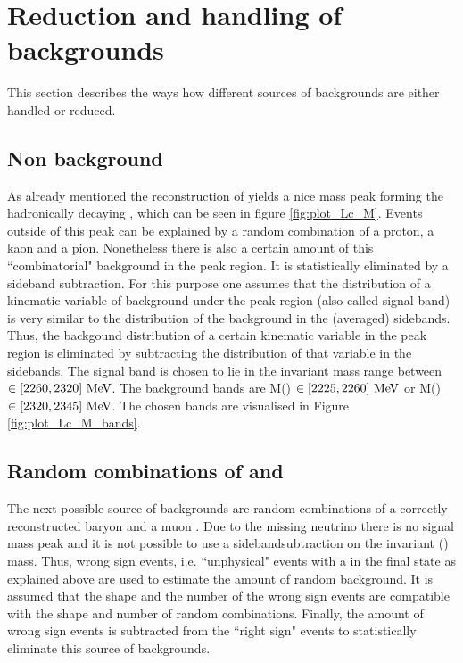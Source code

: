 \section{Reduction and handling of backgrounds}
This section describes the ways how different sources of backgrounds are either handled or reduced.

\subsection{Non \Lc background}
As already mentioned the reconstruction of \pKpi yields a nice mass peak forming the hadronically decaying \Lc, which can be seen in figure \ref{fig:plot_Lc_M}. 
Events outside of this peak can be explained by a random combination of a proton, a kaon and a pion.
Nonetheless there is also a certain amount of this ``combinatorial" background in the peak region.
It is statistically eliminated by a sideband subtraction. 
For this purpose one assumes that the distribution of a kinematic variable of background under the peak region (also called signal band) is very similar to the distribution of the background in the (averaged) sidebands.
Thus, the backgound distribution of a certain kinematic variable in the peak region is eliminated by subtracting the distribution of that variable in the sidebands.
The signal band is chosen to lie in the invariant \pKpi mass range between $\in \left[2260, 2320\right]\mathrm{\,Me\kern -0.1em V}$.
The background bands are M(\pKpi) $\in \left[2225, 2260\right]\mathrm{\,Me\kern -0.1em V}$ or M(\pKpi) $\in \left[2320, 2345\right]\mathrm{\,Me\kern -0.1em V}$.
The chosen bands are visualised in Figure \ref{fig:plot_Lc_M_bands}.

\subsection{Random combinations of \Lc and \mun}
The next possible source of backgrounds are random combinations of a correctly reconstructed \Lc baryon and a muon \mun. 
Due to the missing neutrino \neumb there is no signal mass peak and it is not possible to use a sidebandsubtraction on the invariant \pKpi\mun (\Lc\mun) mass.
Thus, wrong sign events, i.e. ``unphysical" events with a \Lc\mup in the final state as explained above are used to estimate the amount of random \Lc\mun background.
It is assumed that the shape and the number of the wrong sign events are compatible with the shape and number of random \Lc\mun combinations.
Finally, the amount of wrong sign events is subtracted from the ``right sign" events to statistically eliminate this source of backgrounds.

